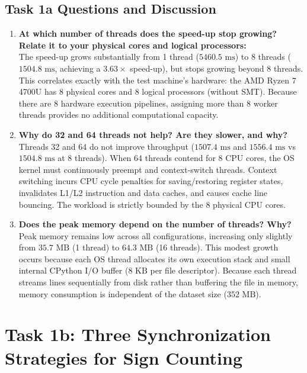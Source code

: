 \documentclass{labreport}
\begin{document}
\subsection{Task 1a Questions and Discussion}
\begin{enumerate}
    \item \textbf{At which number of threads does the speed-up stop growing? Relate it to your physical cores and logical processors:}\\
    The speed-up grows substantially from 1 thread ($5460.5\text{ ms}$) to 8 threads ($1504.8\text{ ms}$, achieving a $3.63\times$ speed-up), but stops growing beyond 8 threads. This correlates exactly with the test machine's hardware: the AMD Ryzen 7 4700U has 8 physical cores and 8 logical processors (without SMT). Because there are 8 hardware execution pipelines, assigning more than 8 worker threads provides no additional computational capacity.
    
    \item \textbf{Why do 32 and 64 threads not help? Are they slower, and why?}\\
    Threads 32 and 64 do not improve throughput ($1507.4\text{ ms}$ and $1556.4\text{ ms}$ vs $1504.8\text{ ms}$ at 8 threads). When 64 threads contend for 8 CPU cores, the OS kernel must continuously preempt and context-switch threads. Context switching incurs CPU cycle penalties for saving/restoring register states, invalidates L1/L2 instruction and data caches, and causes cache line bouncing. The workload is strictly bounded by the 8 physical CPU cores.
    
    \item \textbf{Does the peak memory depend on the number of threads? Why?}\\
    Peak memory remains low across all configurations, increasing only slightly from $35.7\text{ MB}$ (1 thread) to $64.3\text{ MB}$ (16 threads). This modest growth occurs because each OS thread allocates its own execution stack and small internal CPython I/O buffer ($8\text{ KB}$ per file descriptor). Because each thread streams lines sequentially from disk rather than buffering the file in memory, memory consumption is independent of the dataset size ($352\text{ MB}$).
\end{enumerate}

\newpage

\section{Task 1b: Three Synchronization Strategies for Sign Counting}
\end{document}
